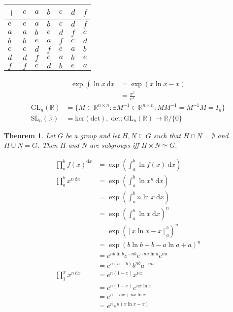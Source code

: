 \documentclass[a4paper,11pt]{article}
\theoremstyle{plain}
\newtheorem{theorem}{Theorem}
\theoremstyle{definition}
\newcommand{\R}{\mathbb{R}}
\newcommand{\dx}{\text{d}}
\begin{document}
\begin{center}
\begin{tabular}{l|llllll}
	  + & $e$ & $a$ & $b$ & $c$ & $d$ & $f$ \\ \hline
	$e$ & $e$ & $a$ & $b$ & $c$ & $d$ & $f$ \\
	$a$ & $a$ & $b$ & $e$ & $d$ & $f$ & $c$ \\
	$b$ & $b$ & $e$ & $a$ & $f$ & $c$ & $d$ \\
	$c$ & $c$ & $d$ & $f$ & $e$ & $a$ & $b$ \\
	$d$ & $d$ & $f$ & $c$ & $a$ & $b$ & $e$ \\
	$f$ & $f$ & $c$ & $d$ & $b$ & $e$ & $a$ \\
\end{tabular}
\end{center}
\begin{align*}
	\exp \int \ln x\ \dx x &= \exp\left(x\ln x -x\right)\\
						   &= \frac{x^x}{e^x}
\end{align*}
\newpage
\begin{align*}
	\text{GL}_n(\R) &= \{M\in\R^{n\times n}:\exists M^{-1}\in\R^{n\times
	n}:MM^{-1}=M^{-1}M=I_n\}\\
	\text{SL}_n(\R) &= \text{ker}(\text{det}),\; \text{det}:\text{GL}_n(\R)\rightarrow\R/\{0\}
\end{align*}
\begin{theorem}
	Let $G$ be a group and let $H,N\subseteq G$ such that $H\cap
	N=\emptyset$ and $H\cup N = G$. Then $H$ and $N$ are subgroups iff
	$H{\times}N \simeq G$.
\end{theorem}
\begin{align*}
	\prod_a^b f(x)^{\dx x} &= \exp \left(\int_a^b \ln f(x)\ \dx x\right) \\
	\prod_a^b {x}^{n\ \dx x} &= \exp \left(\int_a^b \ln x^n\ \dx x\right) \\
	&= \exp \left(\int_a^b n \ln x\ \dx x\right) \\
	&= \exp \left(\int_a^b \ln x\ \dx x\right)^n \\
	&= \exp \left(\left[x\ln x - x\right]_a^b\right)^n \\
	&= \exp \left(b\ln b - b - a\ln a + a\right)^n \\
	&= e^{nb\ln b}e^{-nb}e^{-na\ln a}e^{na} \\
	&= e^{n(a-b)}b^{nb}a^{-na} \\
	\prod_1^x {x}^{n\ \dx x} &= e^{n(1-x)}x^{nx} \\
	&= e^{n(1-x)}e^{nx\ln x} \\
	&= e^{n-nx+nx\ln x} \\
	&= e^n e^{n(x\ln x - x)} \\
\end{align*}
\end{document}
